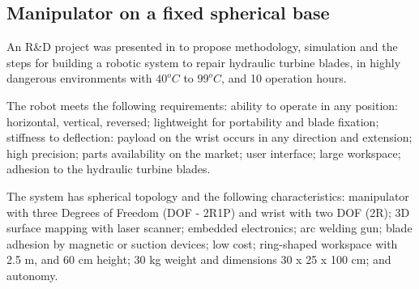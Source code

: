 \subsection{Manipulator on a fixed spherical base}
An R\&D project was presented in \cite{motta2010prototype} to propose
methodology, simulation and the steps for building a robotic system to repair
hydraulic turbine blades, %
 in highly dangerous environments with $ 40^o C$ to $ 99^o C$, and 10 operation
 hours.

The robot meets the following requirements: ability to operate in any position:
horizontal, vertical, reversed; lightweight for portability and blade fixation;
stiffness to deflection: payload on the wrist occurs in any direction and
extension; high precision; parts availability on the market; user interface;
large workspace; adhesion to the hydraulic turbine blades.


The system has spherical topology and the following characteristics: manipulator
with three Degrees of Freedom (DOF - 2R1P) and wrist with two DOF (2R); 3D
surface mapping with laser scanner; embedded electronics; arc welding gun; blade adhesion by magnetic or
suction devices; low cost; ring-shaped workspace with 2.5 m, and 60 cm height;
30 kg weight and dimensions 30 x 25 x 100 cm; and autonomy.

